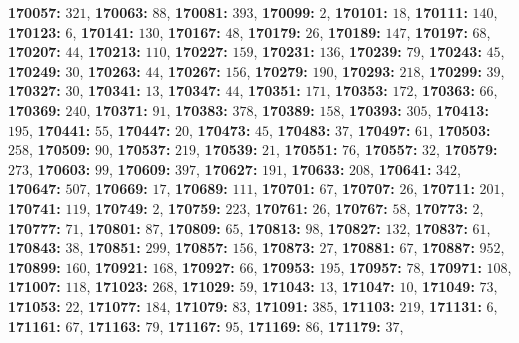 \textsf{\bfseries 170057:} $321$, \textsf{\bfseries 170063:} $88$, \textsf{\bfseries 170081:} $393$, \textsf{\bfseries 170099:} $2$, \textsf{\bfseries 170101:} $18$, \textsf{\bfseries 170111:} $140$, \textsf{\bfseries 170123:} $6$, \textsf{\bfseries 170141:} $130$, \textsf{\bfseries 170167:} $48$, \textsf{\bfseries 170179:} $26$, \textsf{\bfseries 170189:} $147$, \textsf{\bfseries 170197:} $68$, \textsf{\bfseries 170207:} $44$, \textsf{\bfseries 170213:} $110$, \textsf{\bfseries 170227:} $159$, \textsf{\bfseries 170231:} $136$, \textsf{\bfseries 170239:} $79$, \textsf{\bfseries 170243:} $45$, \textsf{\bfseries 170249:} $30$, \textsf{\bfseries 170263:} $44$, \textsf{\bfseries 170267:} $156$, \textsf{\bfseries 170279:} $190$, \textsf{\bfseries 170293:} $218$, \textsf{\bfseries 170299:} $39$, \textsf{\bfseries 170327:} $30$, \textsf{\bfseries 170341:} $13$, \textsf{\bfseries 170347:} $44$, \textsf{\bfseries 170351:} $171$, \textsf{\bfseries 170353:} $172$, \textsf{\bfseries 170363:} $66$, \textsf{\bfseries 170369:} $240$, \textsf{\bfseries 170371:} $91$, \textsf{\bfseries 170383:} $378$, \textsf{\bfseries 170389:} $158$, \textsf{\bfseries 170393:} $305$, \textsf{\bfseries 170413:} $195$, \textsf{\bfseries 170441:} $55$, \textsf{\bfseries 170447:} $20$, \textsf{\bfseries 170473:} $45$, \textsf{\bfseries 170483:} $37$, \textsf{\bfseries 170497:} $61$, \textsf{\bfseries 170503:} $258$, \textsf{\bfseries 170509:} $90$, \textsf{\bfseries 170537:} $219$, \textsf{\bfseries 170539:} $21$, \textsf{\bfseries 170551:} $76$, \textsf{\bfseries 170557:} $32$, \textsf{\bfseries 170579:} $273$, \textsf{\bfseries 170603:} $99$, \textsf{\bfseries 170609:} $397$, \textsf{\bfseries 170627:} $191$, \textsf{\bfseries 170633:} $208$, \textsf{\bfseries 170641:} $342$, \textsf{\bfseries 170647:} $507$, \textsf{\bfseries 170669:} $17$, \textsf{\bfseries 170689:} $111$, \textsf{\bfseries 170701:} $67$, \textsf{\bfseries 170707:} $26$, \textsf{\bfseries 170711:} $201$, \textsf{\bfseries 170741:} $119$, \textsf{\bfseries 170749:} $2$, \textsf{\bfseries 170759:} $223$, \textsf{\bfseries 170761:} $26$, \textsf{\bfseries 170767:} $58$, \textsf{\bfseries 170773:} $2$, \textsf{\bfseries 170777:} $71$, \textsf{\bfseries 170801:} $87$, \textsf{\bfseries 170809:} $65$, \textsf{\bfseries 170813:} $98$, \textsf{\bfseries 170827:} $132$, \textsf{\bfseries 170837:} $61$, \textsf{\bfseries 170843:} $38$, \textsf{\bfseries 170851:} $299$, \textsf{\bfseries 170857:} $156$, \textsf{\bfseries 170873:} $27$, \textsf{\bfseries 170881:} $67$, \textsf{\bfseries 170887:} $952$, \textsf{\bfseries 170899:} $160$, \textsf{\bfseries 170921:} $168$, \textsf{\bfseries 170927:} $66$, \textsf{\bfseries 170953:} $195$, \textsf{\bfseries 170957:} $78$, \textsf{\bfseries 170971:} $108$, \textsf{\bfseries 171007:} $118$, \textsf{\bfseries 171023:} $268$, \textsf{\bfseries 171029:} $59$, \textsf{\bfseries 171043:} $13$, \textsf{\bfseries 171047:} $10$, \textsf{\bfseries 171049:} $73$, \textsf{\bfseries 171053:} $22$, \textsf{\bfseries 171077:} $184$, \textsf{\bfseries 171079:} $83$, \textsf{\bfseries 171091:} $385$, \textsf{\bfseries 171103:} $219$, \textsf{\bfseries 171131:} $6$, \textsf{\bfseries 171161:} $67$, \textsf{\bfseries 171163:} $79$, \textsf{\bfseries 171167:} $95$, \textsf{\bfseries 171169:} $86$, \textsf{\bfseries 171179:} $37$, 
